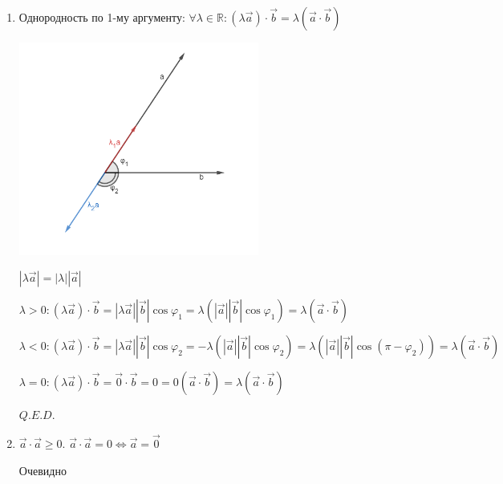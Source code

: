 \documentclass[twoside]{book}
\DeclareMathOperator{\proj}{proj}
\begin{document}
\begin{enumerate}
          \((\vec a)_x = \proj_{\vec i}\vec a = \vec a \cdot \vec i =
          (\vec a_1 + \vec a_2) \cdot \frac{\vec b}{|\vec b|} =
          \frac{1}{|\vec b|} ((\vec a_1 + \vec a_2) \cdot \vec b)\)

          \(m = 1, 2: (\vec a_m)_x = \proj_{\vec i}\vec a_m = \vec a_m \cdot i =
          \vec a_m \cdot \frac{\vec b}{|\vec b|} =
          \frac{1}{|\vec b|} (\vec a_m \cdot \vec b)\)

          \(\begin{rcases*}
              \vec a = \frac{1}{|\vec b|} ((\vec a_1 + \vec a_2) \cdot \vec b) \\
              \vec a = \vec a_1 + \vec a_2 = \frac{1}{|\vec b|} (\vec a_1 \cdot \vec b) + \frac{1}{|\vec b|} (\vec a_2 \cdot \vec b)
          \end{rcases*} \Rightarrow \frac{1}{|\vec b|} ((\vec a_1 + \vec a_2) \cdot \vec b) =
          \frac{1}{|\vec b|} (\vec a_1 \cdot \vec b) + \frac{1}{|\vec b|} (\vec a_2 \cdot \vec b) \Rightarrow \\
          \Rightarrow (\vec a_1 + \vec a_2) \cdot \vec b = \vec a_1 \cdot \vec b + \vec a_2 \cdot \vec b \quad Q.E.D\)
    \item Однородность по 1-му аргументу: \(\forall \lambda \in \mathbb{R}: (\lambda \vec a)\cdot \vec b = \lambda(\vec a \cdot \vec b)\)
          \begin{center}
              \includegraphics[height=7cm]{Images/Chapter_1/1-4-4.png}
          \end{center}
          \(|\lambda \vec a| = |\lambda| |\vec a|\)

          \(\lambda > 0: (\lambda \vec a)\cdot \vec b = |\lambda \vec a| |\vec b| \cos\varphi_1 = \lambda(|\vec a| |\vec b| \cos\varphi_1) = \lambda(\vec a \cdot \vec b)\)

          \(\lambda < 0: (\lambda \vec a)\cdot \vec b = |\lambda \vec a| |\vec b| \cos\varphi_2 = -\lambda(|\vec a| |\vec b| \cos\varphi_2) = \lambda(|\vec a| |\vec b| \cos(\pi - \varphi_2)) = \lambda(\vec a \cdot \vec b)\)

          \(\lambda = 0: (\lambda \vec a)\cdot \vec b = \vec 0 \cdot \vec b = 0 = 0(\vec a \cdot \vec b) = \lambda(\vec a \cdot \vec b)\)

          \(Q.E.D.\)
    \item \(\vec a \cdot \vec a \geq 0\). \(\vec a \cdot \vec a = 0 \Leftrightarrow \vec a = \vec 0\)

          Очевидно
\end{enumerate}
\end{document}
